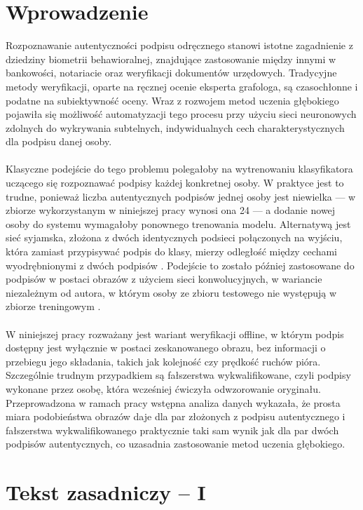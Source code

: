 \documentclass[12pt,twoside,openright]{article}
\begin{document}
\section{Wprowadzenie}
Rozpoznawanie autentyczności podpisu odręcznego stanowi istotne zagadnienie z dziedziny biometrii behawioralnej, 
znajdujące zastosowanie między innymi w bankowości, notariacie oraz weryfikacji dokumentów urzędowych. 
Tradycyjne metody weryfikacji, oparte na ręcznej ocenie eksperta grafologa, są czasochłonne i podatne na subiektywność oceny. 
Wraz z rozwojem metod uczenia głębokiego pojawiła się możliwość automatyzacji tego procesu przy użyciu sieci neuronowych zdolnych do wykrywania subtelnych, 
indywidualnych cech charakterystycznych dla podpisu danej osoby.
\\\\
Klasyczne podejście do tego problemu polegałoby na wytrenowaniu klasyfikatora uczącego się rozpoznawać podpisy każdej konkretnej osoby. 
W praktyce jest to trudne, ponieważ liczba autentycznych podpisów jednej osoby jest niewielka --- w zbiorze wykorzystanym w niniejszej pracy wynosi ona 24 --- a dodanie nowej osoby do systemu wymagałoby ponownego trenowania modelu. 
Alternatywą jest sieć syjamska, złożona z dwóch identycznych podsieci połączonych na wyjściu, która zamiast przypisywać podpis do klasy, mierzy odległość między cechami wyodrębnionymi z dwóch podpisów \cite{bromley1993}. 
Podejście to zostało później zastosowane do podpisów w postaci obrazów z użyciem sieci konwolucyjnych, w wariancie niezależnym od autora, w którym osoby ze zbioru testowego nie występują w zbiorze treningowym \cite{dey2017}.
\\\\
W niniejszej pracy rozważany jest wariant weryfikacji offline, w którym podpis dostępny jest wyłącznie w postaci zeskanowanego obrazu, bez informacji o przebiegu jego składania, takich jak kolejność czy prędkość ruchów pióra. 
Szczególnie trudnym przypadkiem są fałszerstwa wykwalifikowane, czyli podpisy wykonane przez osobę, która wcześniej ćwiczyła odwzorowanie oryginału. 
Przeprowadzona w ramach pracy wstępna analiza danych wykazała, że prosta miara podobieństwa obrazów daje dla par złożonych z podpisu autentycznego i fałszerstwa wykwalifikowanego praktycznie taki sam wynik jak dla par dwóch podpisów autentycznych, co uzasadnia zastosowanie metod uczenia głębokiego.
\\


\section{Tekst zasadniczy -- I}
\end{document}
